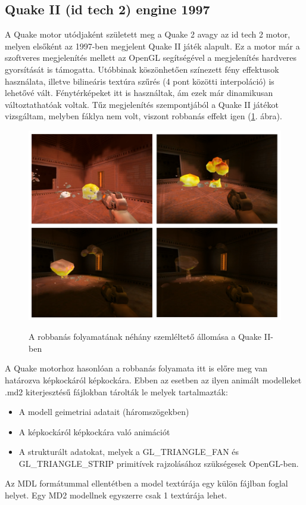 \subsection{Quake II (id tech 2) engine 1997}
A Quake motor utódjaként született meg a Quake 2 avagy az id tech 2 motor, melyen elsőként az 1997-ben megjelent Quake II játék alapult. Ez a motor már a szoftveres megjelenítés mellett az OpenGL segítségével a megjelenítés hardveres gyorsítását is támogatta. Utóbbinak köszönhetően színezett fény effektusok használata, illetve bilineáris textúra szűrés (4 pont közötti interpoláció) is lehetővé vált. Fénytérképeket itt is használtak, ám ezek már dinamikusan változtathatóak voltak. \cite{wikiQuake2, fsQuake2} Tűz megjelenítés szempontjából a Quake II játékot vizsgáltam, melyben fáklya nem volt, viszont robbanás effekt igen (\ref{fig:quake2explosion}. ábra).

\begin{figure}[h]
 \caption{A robbanás folyamatának néhány szemléltető állomása a Quake II-ben}
 \includegraphics[width=\textwidth]{kepek/quake2explosion9.png}
 \label{fig:quake2explosion}
\end{figure}

A Quake motorhoz hasonlóan a robbanás folyamata itt is előre meg van határozva képkockáról képkockára. Ebben az esetben az ilyen animált modelleket .md2 kiterjesztésű fájlokban tárolták le melyek tartalmazták:
\begin{itemize} 
\item A modell geimetriai adatait (háromszögekben)
\item A képkockáról képkockára való animációt
\item A strukturált adatokat, melyek a GL\_TRIANGLE\_FAN és GL\_TRIANGLE\_STRIP primitívek rajzolásához szükségesek OpenGL-ben.
\end{itemize} 
Az MDL formátummal ellentétben a model textúrája egy külön fájlban foglal helyet. Egy MD2 modellnek egyszerre csak 1 textúrája lehet.  \cite{MD2format}

